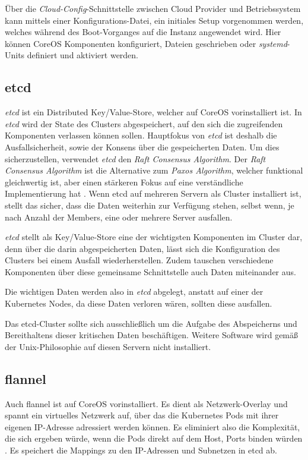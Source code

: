 Über die \emph{Cloud-Config}-Schnittstelle zwischen
Cloud Provider und Betriebssystem
kann mittels einer Konfigurations-Datei, ein initiales Setup vorgenommen werden,
welches während des Boot-Vorganges auf die Instanz angewendet wird.
Hier können CoreOS Komponenten konfiguriert, Dateien
geschrieben oder
\emph{systemd}-Units definiert und aktiviert werden.

\subsection{etcd}

\emph{etcd} \cite{etcd} ist ein Distributed Key/Value-Store, welcher auf CoreOS
vorinstalliert ist.
In \emph{etcd} wird der State des Clusters abgespeichert, auf den
sich die zugreifenden Komponenten verlassen können sollen.
Hauptfokus von \emph{etcd} ist deshalb die Ausfallsicherheit, sowie der Konsens über
die gespeicherten Daten.
Um dies sicherzustellen, verwendet \emph{etcd} den
\emph{Raft Consensus Algorithm}.
Der \emph{Raft Consensus Algorithm} ist die Alternative zum
\emph{Paxos Algorithm},
welcher funktional gleichwertig ist, aber einen stärkeren Fokus auf eine
verständliche Implementierung hat \cite{Raft}.
Wenn etcd auf mehreren Servern als Cluster installiert ist, stellt das sicher,
dass die Daten weiterhin zur Verfügung stehen, selbst wenn, je nach Anzahl
der Members, eine oder mehrere Server ausfallen.

\emph{etcd} stellt als Key/Value-Store eine der wichtigsten Komponenten im
Cluster dar, denn
über die darin abgespeicherten Daten, lässt sich die Konfiguration des Clusters
bei einem Ausfall wiederherstellen. Zudem tauschen verschiedene Komponenten
über diese gemeinsame Schnittstelle auch Daten miteinander aus.

Die wichtigen Daten werden also in \emph{etcd} abgelegt, anstatt auf einer der
Kubernetes Nodes, da diese Daten verloren wären, sollten diese ausfallen.

Das etcd-Cluster sollte sich ausschließlich um die Aufgabe des Abspeicherns und
Bereithaltens dieser kritischen Daten beschäftigen. Weitere Software wird gemäß
der Unix-Philosophie  \cite{ThePragm}
auf diesen Servern
nicht installiert.

\subsection{flannel}
Auch flannel \cite{flannel} ist auf CoreOS vorinstalliert. Es dient als Netzwerk-Overlay und
spannt ein virtuelles Netzwerk auf,
über das die Kubernetes Pods mit ihrer eigenen IP-Adresse adressiert werden können.
Es eliminiert also die Komplexität, die sich ergeben würde,
wenn die Pods direkt auf dem Host, Ports binden würden \cite{borg}.
Es speichert die Mappings zu den IP-Adressen und Subnetzen in etcd ab.

